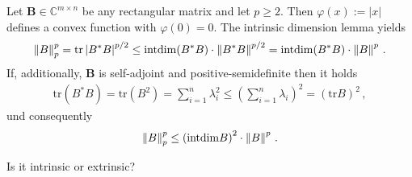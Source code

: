   \begin{example*}
    Let 
    $
      \mathbf{B} \in \mathbb{C}^{m\times n}
    $
    be any rectangular matrix and let $p\ge 2$.
    Then 
    $
      \varphi(x)
      :=
      \left| x \right|
    $
  defines a convex function with $\varphi(0)=0$.
  The intrinsic dimension lemma yields
  \begin{gather}
    \left\lVert B\right\rVert^p_p
    =
    \mathrm{tr}
      \left|
      B^* B
      \right|
      ^{p/2}
    \le
    \mathrm{intdim}
    (
      B^* B
    )
      \cdot
      \left\lVert
      B^* B
    \right\rVert^{p/2}
    =
    \mathrm{intdim}
    (
      B^* B
    )
      \cdot
      \left\lVert
        B
    \right\rVert^{p}
    \,.
  \end{gather}
  If, additionally, $\mathbf{B}$ is self-adjoint and positive-semidefinite
  then it holds 
  \begin{gather}
    \mathrm{tr}
    (
      B^* B
    )
    =
    \mathrm{tr}
    (
    B^2
    )
    =
    \sum_{i=1}^{n} 
    \lambda_i^2
    \le 
    \left( 
    \sum_{i=1}^{n} 
    \lambda_i
    \right)
    ^{2}
    =
    \left( 
    \mathrm{tr}
    B
    \right)
    ^2
    \,,
  \end{gather}
  und consequently
  \begin{gather}
    \left\lVert B\right\rVert^p_p
    \le
    \left( 
    \mathrm{intdim}
    B
    \right)
    ^2
      \cdot
      \left\lVert
        B
    \right\rVert^{p}
    \,.
  \end{gather}
  \end{example*}
\begin{takeaways}
  Is it intrinsic or extrinsic?
  \lipsum[4]
\end{takeaways}
